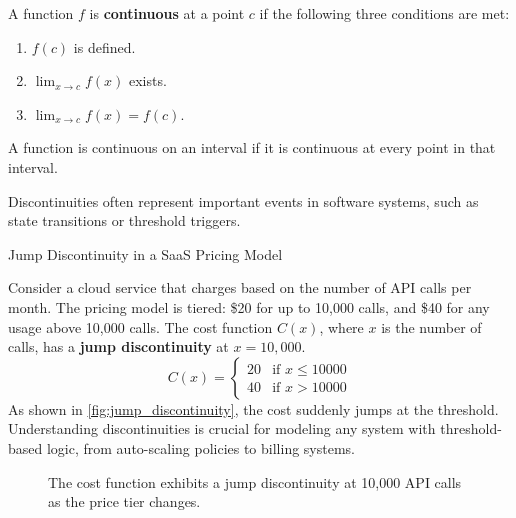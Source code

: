 \begin{definition}[Continuity]
A function \( f \) is \textbf{continuous} at a point \( c \) if the following three conditions are met:
\begin{enumerate}
    \item \( f(c) \) is defined.
    \item \( \lim_{x \to c} f(x) \) exists.
    \item \( \lim_{x \to c} f(x) = f(c) \).
\end{enumerate}
A function is continuous on an interval if it is continuous at every point in that interval.
\end{definition}

Discontinuities often represent important events in software systems, such as state transitions or threshold triggers.

\begin{example} Jump Discontinuity in a SaaS Pricing Model
    
Consider a cloud service that charges based on the number of API calls per month. The pricing model is tiered: \$20 for up to 10,000 calls, and \$40 for any usage above 10,000 calls. The cost function \(C(x)\), where \(x\) is the number of calls, has a \textbf{jump discontinuity} at \(x = 10,000\).
\[
C(x) =
\begin{cases}
    20 & \text{if } x \le 10000 \\
    40 & \text{if } x > 10000
\end{cases}
\]
As shown in \autoref{fig:jump_discontinuity}, the cost suddenly jumps at the threshold. Understanding discontinuities is crucial for modeling any system with threshold-based logic, from auto-scaling policies to billing systems.
\end{example}

\begin{figure}[htbp]
\centering
{}
\caption{The cost function exhibits a jump discontinuity at 10,000 API calls as the price tier changes.}
\label{fig:jump_discontinuity}
\end{figure}

